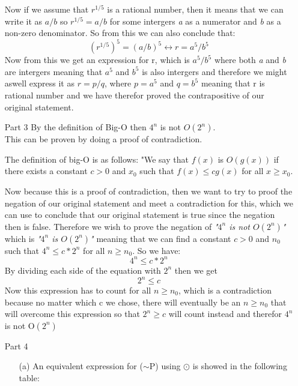 \documentclass[12pt,a4paper]{article}
\theoremstyle{plain}
\theoremstyle{definition}
\begin{document}
\begin{itemize}
    Now if we assume that $r^{1/5}$ is a rational number, then it means that we can write it as $a/b$ so $r^{1/5}=a/b$ for some intergers \textit{a} as a 
    numerator and \textit{b} as a non-zero denominator.
    So from this we can also conclude that:
    \begin{equation}
        (r^{1/5})^5=(a/b)^5 \leftrightarrow r=a^5/b^5
    \end{equation}
    Now from this we get an expression for r, which is $a^5/b^5$ where both \textit{a} and \textit{b} are intergers meaning that $a^5$ and $b^5$ is also intergers and therefore we might aswell express it as $r=p/q$, where $p=a^5$ and $q=b^5$ meaning that r is rational number and we have therefor proved the contrapositive of our original statement.
    
\item[Part 3]
    By the definition of Big-O then $4^n$ is not $O(2^n)$.\\
    This can be proven by doing a proof of contradiction.

    The definition of big-O is as follows: "We say that $f(x)$ is $O(g(x))$ if there exists a constant $c > 0$ and $x_0$ such that $f(x)\leq cg(x)$ for all $x\geq x_0$.

    Now because this is a proof of contradiction, then we want to try to proof the negation of our original statement and meet a contradiction for this, which we can use to conclude that our original statement is true since the negation then is false.
    Therefore we wish to prove the negation of \textit{"$4^n$ is not $O(2^n)$"} which is \textit{"$4^n$ is $O(2^n)$"} meaning that we can find a constant $c > 0$ and $n_0$ such that $4^n\leq c*2^n$ for all $n\geq n_0$.
    So we have:
    \begin{equation}
        4^n\leq c*2^n
    \end{equation}
    By dividing each side of the equation with $2^n$ then we get
    \begin{equation}
        2^n\leq c
    \end{equation}
    Now this expression has to count for all $n \geq n_0$, which is a contradiction because no matter which c we chose, there will eventually be an $n \geq n_0$ that will overcome this expression so that $2^n\geq c$ will count instead and therefor $4^n$ is not O$(2^n)$

\item[Part 4]
\begin{enumerate}
    \item[(a)]
    An equivalent expression for ($\sim$P) using $\odot$ is showed in the following table:
    

\end{enumerate}
\end{itemize}
\end{document}
